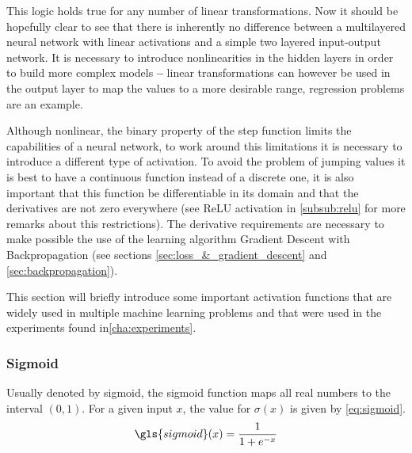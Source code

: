 This logic holds true for any number of linear transformations. Now it should be hopefully clear to see that there is inherently no difference between a multilayered neural network with linear activations and a simple two layered input-output network. It is necessary to introduce nonlinearities in the hidden layers in order to build more complex models \textbf{--} linear transformations can however be used in the output layer to map the values to a more desirable range, regression problems are an example.

Although nonlinear, the binary property of the step function limits the capabilities of a neural network, to work around this limitations it is necessary to introduce a different type of activation. To avoid the problem of jumping values it is best to have a continuous function instead of a discrete one, it is also important that this function be differentiable in its domain and that the derivatives are not zero everywhere (see  \gls{ReLU} activation in \autoref{subsub:relu} for more remarks about this restrictions). The derivative requirements are necessary to make possible the use of the learning algorithm Gradient Descent with Backpropagation (see sections \ref{sec:loss_&_gradient_descent} and \ref{sec:backpropagation}).

This section will briefly introduce some important activation functions that are widely used in multiple machine learning problems and that were used in the experiments found in\autoref{cha:experiments}.

\subsubsection{Sigmoid} \label{subsub:sigmoid}
Usually denoted by \gls{sigmoid}, the sigmoid function maps all real numbers to the interval $(0, 1)$. For a given input $x$, the value for $\sigma(x)$ is given by \autoref{eq:sigmoid}.
\begin{equation} \label{eq:sigmoid}
    \gls{sigmoid}(x) = \frac{1}{1 + e ^ {-x}}
\end{equation}


